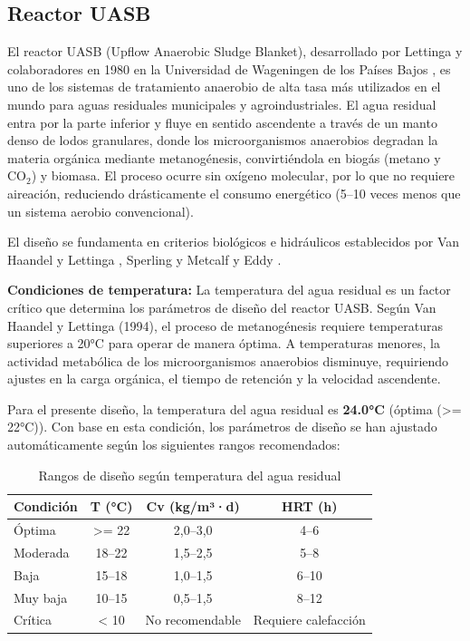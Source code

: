 \documentclass[12pt,a4paper]{article}
\begin{document}
\subsection{Reactor UASB}

El reactor UASB (Upflow Anaerobic Sludge Blanket), desarrollado por Lettinga y colaboradores en 1980 en la Universidad de Wageningen de los Países Bajos \cite{vanhaandel1994}, es uno de los sistemas de tratamiento anaerobio de alta tasa más utilizados en el mundo para aguas residuales municipales y agroindustriales. El agua residual entra por la parte inferior y fluye en sentido ascendente a través de un manto denso de lodos granulares, donde los microorganismos anaerobios degradan la materia orgánica mediante metanogénesis, convirtiéndola en biogás (metano y CO$_2$) y biomasa. El proceso ocurre sin oxígeno molecular, por lo que no requiere aireación, reduciendo drásticamente el consumo energético (5--10 veces menos que un sistema aerobio convencional).

El diseño se fundamenta en criterios biológicos e hidráulicos establecidos por Van Haandel y Lettinga \cite{vanhaandel1994}, Sperling \cite{sperling2007} y Metcalf y Eddy \cite{metcalf2014}.

\textbf{Condiciones de temperatura:} La temperatura del agua residual es un factor crítico que determina los parámetros de diseño del reactor UASB. Según Van Haandel y Lettinga (1994), el proceso de metanogénesis requiere temperaturas superiores a 20°C para operar de manera óptima. A temperaturas menores, la actividad metabólica de los microorganismos anaerobios disminuye, requiriendo ajustes en la carga orgánica, el tiempo de retención y la velocidad ascendente.

Para el presente diseño, la temperatura del agua residual es \textbf{24.0°C} (óptima (>= 22°C)). Con base en esta condición, los parámetros de diseño se han ajustado automáticamente según los siguientes rangos recomendados:

\begin{table}[H]
\centering
\caption{Rangos de diseño según temperatura del agua residual}
\small
\begin{tabular}{lccc}
\toprule
\textbf{Condición} & \textbf{T (°C)} & \textbf{Cv (kg/m³·d)} & \textbf{HRT (h)} \\
\midrule
Óptima & >= 22 & 2,0--3,0 & 4--6 \\
Moderada & 18--22 & 1,5--2,5 & 5--8 \\
Baja & 15--18 & 1,0--1,5 & 6--10 \\
Muy baja & 10--15 & 0,5--1,5 & 8--12 \\
Crítica & < 10 & No recomendable & Requiere calefacción \\
\bottomrule
\end{tabular}
\end{table}
\end{document}
